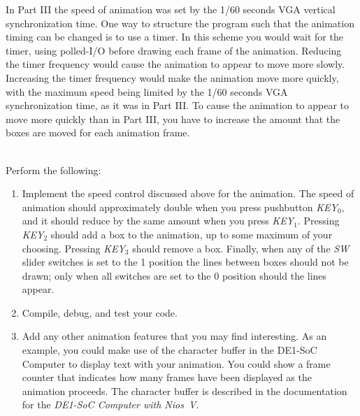 \documentclass[epsfig,10pt,fullpage]{article}
\newcommand{\CommonDocsPath}{../../../../common/docs}
\begin{document}
In Part III the speed of animation was set by the 1/60 seconds VGA vertical synchronization time.
One way to structure the program such that the animation timing can be changed is to use 
a timer. In this scheme you would wait for the timer, using polled-I/O before drawing
each frame of the animation.  Reducing the
timer frequency would cause the animation to appear to move more slowly. Increasing the
timer frequency would make the animation move more quickly, with the maximum speed being limited
by the 1/60 seconds VGA synchronization time, as it was in Part III.  To cause the animation 
to appear to move more quickly than in Part III, you have to increase the amount that the 
boxes are moved for each animation frame.

~\\
Perform the following:

\begin{enumerate}

\item Implement the speed control discussed above for the animation. The speed of animation 
should approximately double when you press pushbutton {\it KEY}$_0$, and it should reduce by 
the same amount when you press {\it KEY}$_1$. Pressing {\it KEY}$_2$ should add a box to the
animation, up to some maximum of your choosing. Pressing {\it KEY}$_3$ should remove a
box. Finally, when any of the {\it SW} slider switches is set to the 1 position the lines 
between boxes should not be drawn; only when all switches are set to the 0 position should 
the lines appear.

\item Compile, debug, and test your code. 

\item Add any other animation features that you may find interesting. As an example, you
could make use of the character buffer in the DE1-SoC Computer to display text with your
animation. You could show a frame counter that indicates how many frames have been
displayed as the animation proceeds. The character buffer is described in the
documentation for the {\it DE1-SoC Computer with Nios~V}. 
\end{enumerate}



\end{document}
